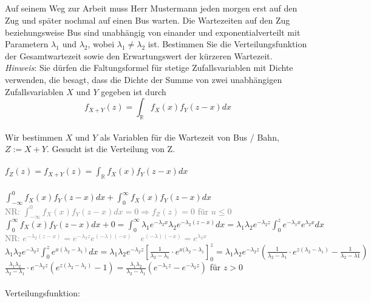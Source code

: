 \documentclass[a4paper]{article}
\begin{document}
\subsection{}
Auf seinem Weg zur Arbeit muss Herr Mustermann jeden morgen erst auf den Zug und später nochmal auf einen Bus warten. Die Wartezeiten auf den Zug beziehungsweise Bus sind unabhängig von einander und exponentialverteilt mit Parametern $\lambda_1$ und $\lambda_2$, wobei $\lambda_1 \neq \lambda_2$ ist. Bestimmen Sie die Verteilungsfunktion der Gesamtwartezeit sowie den Erwartungswert der kürzeren Wartezeit.\\
\textit{Hinweis}: Sie dürfen die Faltungsformel für stetige Zufallsvariablen mit Dichte verwenden, die besagt, dass die Dichte der Summe von zwei unabhängigen Zufallsvariablen $X$ und $Y$ gegeben ist durch\\
\[f_{X+Y}(z) = \int_\mathbb{R} f_X(x)f_Y(z-x)dx\]\\
Wir bestimmen $X$ und $Y$ als Variablen für die Wartezeit von Bus / Bahn, $Z := X+Y$. Gesucht ist die Verteilung von Z.\\\\
\(f_Z(z) = f_{X+Y}(z)=\int_\mathbb{R}f_X(x)f_Y(z-x)dx\)\\\\
\(\int^0_{-\infty}f_X(x)f_Y(z-x)dx+\int^\infty_0f_X(x)f_Y(z-x)dx\)\\
\textcolor{gray}{NR: $\int^0_{-\infty}f_X(x)f_Y(z-x)dx = 0 \Rightarrow f_Z(z)=0$ für $u \leq 0$}\\
\(\int^\infty_0f_X(x)f_Y(z-x)dx+0=\int^\infty_0\lambda_1e^{-\lambda_2x}\lambda_2e^{-\lambda_2(z-x)}dx=\lambda_1\lambda_2e^{-\lambda_2z}\int^z_0e^{-\lambda_1x}e^{\lambda_2x}dx\)\\
\textcolor{gray}{NR: $e^{-\lambda_2(z-x)}=e^{-\lambda_2z}e^{(-\lambda) (-x)}\quad e^{(-\lambda)(-x)}=e^{\lambda_2x}$}\\
\(\lambda_1\lambda_2e^{-\lambda_2z}\int^z_0e^{x(\lambda_2-\lambda_1)}dx=\lambda_1\lambda_2e^{-\lambda_2z}\left[\frac{1}{\lambda_2-\lambda_1}\cdot e^{x(\lambda_2-\lambda_1}\right]^z_0=\lambda_1\lambda_2e^{-\lambda_2z}\left(\frac{1}{\lambda_2-\lambda_1}\cdot e^{z(\lambda_2-\lambda_1)}-\frac{1}{\lambda_2-\lambda1}\right)\)\\
\(\frac{\lambda_1\lambda_2}{\lambda_2-\lambda_1}\cdot e^{-\lambda_2z}\left(e^{z(\lambda_2-\lambda_1)}-1\right)=\frac{\lambda_1\lambda_2}{\lambda_2-\lambda_1}\left(e^{-\lambda_1z}-e^{-\lambda_2z}\right)\) für $z>0$\\\\
Verteilungsfunktion:\\\\
\end{document}
